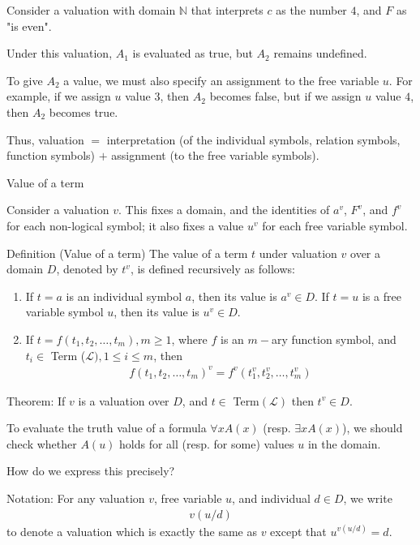 \documentclass{article}
\begin{document}
Consider a valuation with domain $\mathbb{N}$ that interprets $c$ as the number $4$, and $F$ as "is even". 

Under this valuation, $A_1$ is evaluated as true, but $A_2$ remains undefined.

To give $A_2$ a value, we must also specify an assignment to the free variable $u$. For example, if we assign $u$ value $3$, then $A_2$ becomes false, but if we assign $u$ value $4$, then $A_2$ becomes true.

Thus, valuation $=$ interpretation (of the individual symbols, relation symbols, function symbols) $+$ assignment (to the free variable symbols).

Value of a term

Consider a valuation $v$. This fixes a domain, and the identities of $a^v$, $F^v$, and $f^v$ for each non-logical symbol; it also fixes a value $u^v$ for each free variable symbol. 

Definition (Value of a term) The value of a term $t$ under valuation $v$ over a domain $D$, denoted by $t^v$, is defined recursively as follows:

\begin{enumerate}
    \item If $t=a$ is an individual symbol $a$, then its value is $a^v \in D$. If $t = u$ is a free variable symbol $u$, then its value is $u^v \in D$. 
    \item If $t = f(t_1, t_2, \ldots, t_m), m \ge 1$, where $f$ is an $m-$ary function symbol, and $t_i \in $ Term ($\mathcal{L}), 1 \le i \le m$, then
    \begin{align*}
    f(t_1, t_2, \ldots, t_m)^v = f^v(t^v_1, t^v_2, \ldots, t^v_m)
    \end{align*}
\end{enumerate}

Theorem: If $v$ is a valuation over $D$, and $t \in $ Term$(\mathcal{L})$ then $t^v \in D$.

To evaluate the truth value of a formula $\forall x A(x)$ (resp. $\exists x A(x)$), we should check whether $A(u)$ holds for all (resp. for some) values $u$ in the domain.

How do we express this precisely?

Notation: For any valuation $v$, free variable $u$, and individual $d \in D$, we write
\begin{align*}
v(u / d)
\end{align*}
to denote a valuation which is exactly the same as $v$ except that $u^{v(u/d)} = d$.
\end{document}
